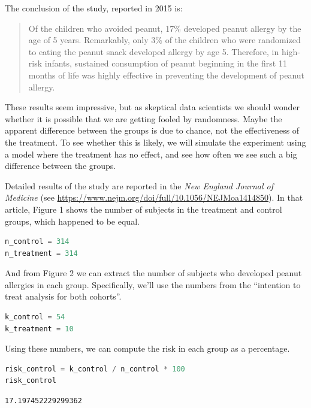 The conclusion of the study, reported in 2015 is:

\begin{quote}
Of the children who avoided peanut, 17\% developed peanut allergy by the
age of 5 years. Remarkably, only 3\% of the children who were randomized
to eating the peanut snack developed allergy by age 5. Therefore, in
high-risk infants, sustained consumption of peanut beginning in the
first 11 months of life was highly effective in preventing the
development of peanut allergy.
\end{quote}

These results seem impressive, but as skeptical data scientists we
should wonder whether it is possible that we are getting fooled by
randomness. Maybe the apparent difference between the groups is due to
chance, not the effectiveness of the treatment. To see whether this is
likely, we will simulate the experiment using a model where the
treatment has no effect, and see how often we see such a big difference
between the groups.

Detailed results of the study are reported in the \emph{New England
Journal of Medicine} (see
\url{https://www.nejm.org/doi/full/10.1056/NEJMoa1414850}). In that
article, Figure 1 shows the number of subjects in the treatment and
control groups, which happened to be equal.

\begin{lstlisting}[language=Python,style=source]
n_control = 314
n_treatment = 314
\end{lstlisting}

And from Figure 2 we can extract the number of subjects who developed
peanut allergies in each group. Specifically, we'll use the numbers from
the ``intention to treat analysis for both cohorts''.

\begin{lstlisting}[language=Python,style=source]
k_control = 54
k_treatment = 10
\end{lstlisting}

Using these numbers, we can compute the risk in each group as a
percentage.

\begin{lstlisting}[language=Python,style=source]
risk_control = k_control / n_control * 100
risk_control
\end{lstlisting}

\begin{lstlisting}[style=output]
17.197452229299362
\end{lstlisting}

